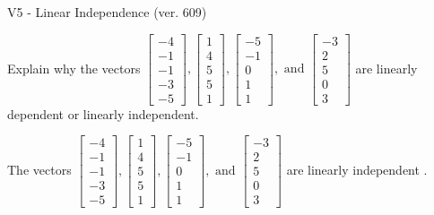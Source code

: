 \begin{exercise}
  \begin{exerciseTitle}V5 - Linear Independence (ver. 609)\end{exerciseTitle}
  \begin{exerciseStatement}
    Explain why the vectors \(\left[\begin{array}{r}
-4 \\
-1 \\
-1 \\
-3 \\
-5
\end{array}\right] , \left[\begin{array}{r}
1 \\
4 \\
5 \\
5 \\
1
\end{array}\right] , \left[\begin{array}{r}
-5 \\
-1 \\
0 \\
1 \\
1
\end{array}\right] , \text{ and } \left[\begin{array}{r}
-3 \\
2 \\
5 \\
0 \\
3
\end{array}\right]\) are linearly dependent or linearly independent.	


  \end{exerciseStatement}
  \begin{exerciseAnswer}
   The vectors \(\left[\begin{array}{r}
-4 \\
-1 \\
-1 \\
-3 \\
-5
\end{array}\right] , \left[\begin{array}{r}
1 \\
4 \\
5 \\
5 \\
1
\end{array}\right] , \left[\begin{array}{r}
-5 \\
-1 \\
0 \\
1 \\
1
\end{array}\right] , \text{ and } \left[\begin{array}{r}
-3 \\
2 \\
5 \\
0 \\
3
\end{array}\right]\) are 
  	 linearly independent  .
  


  \end{exerciseAnswer}
\end{exercise}